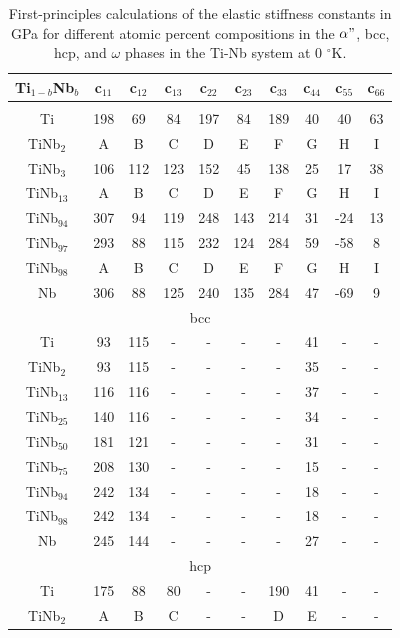 \newpage
\begin{longtable}[H]{ c c c c c c c c c c }
	\caption{First-principles calculations of the elastic stiffness constants in GPa for different atomic percent compositions in the $\alpha"$, bcc, hcp, and $\omega$  phases in the Ti-Nb system at 0 $^\circ$K.} 	\label{Ch7-table:tinbdata} \\
	\hline
	Ti$_{1-b}$Nb$_b$ & c$_{11}$ & c$_{12}$ & c$_{13}$ & c$_{22}$ & c$_{23}$ & c$_{33}$ & c$_{44}$ & c$_{55}$ & c$_{66}$\\
	\hline
	\endhead
	\hline
	\endfoot
	\multicolumn{10}{c}{$\alpha"$}\\
	\hline
	Ti & 198 & 69 & 84 & 197 & 84 & 189 & 40 & 40 & 63 \\		
	TiNb$_{2}$ & A & B & C & D & E & F & G & H & I \\
	TiNb$_{3}$ & 106 & 112 & 123 & 152 & 45 & 138 & 25 & 17 & 38 \\
	TiNb$_{13}$ & A & B & C & D & E & F & G & H & I \\
	TiNb$_{94}$ & 307 & 94 & 119 & 248 & 143 & 214 & 31 & -24 & 13 \\
	TiNb$_{97}$ & 293 & 88 & 115 & 232 & 124 & 284 & 59 & -58 & 8 \\
	TiNb$_{98}$ & A & B & C & D & E & F & G & H & I \\
	Nb & 306 & 88 & 125 & 240 & 135 & 284 & 47 & -69 & 9 \\
	\hline
	\multicolumn{10}{c}{bcc}\\
	\hline
	Ti & 93 & 115 & - & - & - & - & 41 & - & - \\		
	TiNb$_{2}$ & 93 & 115 & - & - & - & - & 35 & - & - \\
	TiNb$_{13}$ & 116 & 116 & - & - & - & - & 37 & - & - \\
	TiNb$_{25}$ & 140 & 116 & - & - & - & - & 34 & - & - \\
	TiNb$_{50}$ & 181 & 121 & - & - & - & - & 31 & - & - \\
	TiNb$_{75}$ & 208 & 130 & - & - & - & - & 15 & - & - \\
	TiNb$_{94}$ & 242 & 134 & - & - & - & - & 18 & - & - \\
	TiNb$_{98}$ & 242 & 134 & - & - & - & - & 18 & - & - \\
	Nb & 245 & 144 & - & - & - & - & 27 & - & - \\
	\hline
	\multicolumn{10}{c}{hcp}\\
	\hline
	Ti & 175 & 88 & 80 & - & - & 190 & 41 & - & - \\		
	TiNb$_{2}$ & A & B & C & - & - & D & E & - & - \\

\end{longtable}
